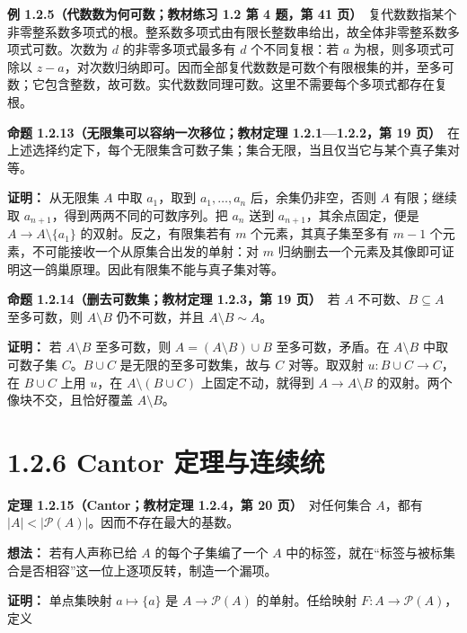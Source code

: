 \documentclass[11pt,a4paper]{article}
\begin{document}
\textbf{例 1.2.5（代数数为何可数；教材练习 1.2 第 4 题，第 41
页）}　复代数数指某个非零整系数多项式的根。整系数多项式由有限长整数串给出，故全体非零整系数多项式可数。次数为
\(d\) 的非零多项式最多有 \(d\) 个不同复根：若 \(a\) 为根，则多项式可除以
\(z-a\)，对次数归纳即可。因而全部复代数数是可数个有限根集的并，至多可数；它包含整数，故可数。实代数数同理可数。这里不需要每个多项式都存在复根。

\textbf{命题 1.2.13（无限集可以容纳一次移位；教材定理 1.2.1---1.2.2，第
19
页）}　在上述选择约定下，每个无限集含可数子集；集合无限，当且仅当它与某个真子集对等。

\textbf{证明：} 从无限集 \(A\) 中取 \(a_1\)，取到 \(a_1,\ldots,a_n\)
后，余集仍非空，否则 \(A\) 有限；继续取
\(a_{n+1}\)，得到两两不同的可数序列。把 \(a_n\) 送到
\(a_{n+1}\)，其余点固定，便是 \(A\to A\setminus\{a_1\}\)
的双射。反之，有限集若有 \(m\) 个元素，其真子集至多有 \(m-1\)
个元素，不可能接收一个从原集合出发的单射：对 \(m\)
归纳删去一个元素及其像即可证明这一鸽巢原理。因此有限集不能与真子集对等。

\textbf{命题 1.2.14（删去可数集；教材定理 1.2.3，第 19 页）}　若 \(A\)
不可数、\(B\subseteq A\) 至多可数，则 \(A\setminus B\) 仍不可数，并且
\(A\setminus B\sim A\)。

\textbf{证明：} 若 \(A\setminus B\) 至多可数，则
\(A=(A\setminus B)\cup B\) 至多可数，矛盾。在 \(A\setminus B\)
中取可数子集 \(C\)。\(B\cup C\) 是无限的至多可数集，故与 \(C\)
对等。取双射 \(u:B\cup C\to C\)，在 \(B\cup C\) 上用 \(u\)，在
\(A\setminus(B\cup C)\) 上固定不动，就得到 \(A\to A\setminus B\)
的双射。两个像块不交，且恰好覆盖 \(A\setminus B\)。

\section[\S{}1.2.6 Cantor
定理与连续统]{1.2.6 Cantor
定理与连续统}\label{cantor-ux5b9aux7406ux4e0eux8fdeux7eedux7edf}

\textbf{定理 1.2.15（Cantor；教材定理 1.2.4，第 20 页）}　对任何集合
\(A\)，都有 \(|A|<|\mathcal P(A)|\)。因而不存在最大的基数。

\textbf{想法：} 若有人声称已给 \(A\) 的每个子集编了一个 \(A\)
中的标签，就在``标签与被标集合是否相容''这一位上逐项反转，制造一个漏项。

\textbf{证明：} 单点集映射 \(a\mapsto\{a\}\) 是 \(A\to\mathcal P(A)\)
的单射。任给映射 \(F:A\to\mathcal P(A)\)，定义
\end{document}
